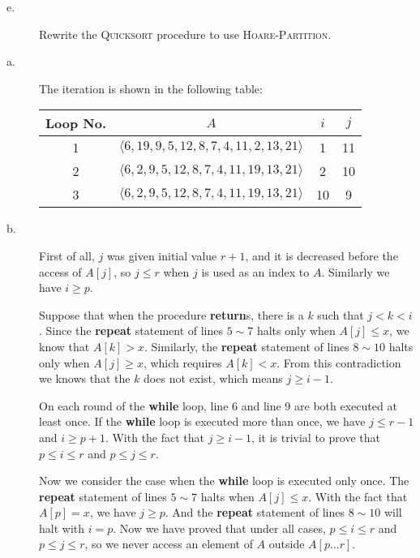 \begin{description}
\item[e. \hspace{9pt}] Rewrite the \textsc{Quicksort} procedure to use \textsc{Hoare-Partition}.
\end{description}

\answer

\begin{description}
\item[a. \hspace{9pt}] The iteration is shown in the following table:

\begin{center}
\begin{tabular}{|c|c|c|c|}
\hline
Loop No. & $A$ & $i$ & $j$\\\hline
1 & $\langle 6, 19, 9, 5, 12, 8, 7, 4, 11, 2, 13, 21\rangle$ & 1 & 11\\\hline
2 & $\langle 6, 2, 9, 5, 12, 8, 7, 4, 11, 19, 13, 21\rangle$ & 2 & 10\\\hline
3 & $\langle 6, 2, 9, 5, 12, 8, 7, 4, 11, 19, 13, 21\rangle$ & 10 & 9\\\hline
\end{tabular}
\end{center}

\item[b. \hspace{9pt}] First of all, $j$ was given initial value $r + 1$, and it is decreased before the access of $A[j]$, so $j\leq r$ when $j$ is used as an index to $A$.
Similarly we have $i \geq p$.

Suppose that when the procedure \textbf{return}s, there is a $k$ such that $j < k < i$. Since the \textbf{repeat} statement of lines $5 \sim 7$ halts only when $A[j] \leq x$, 
we know that $A[k] > x$. Similarly, the \textbf{repeat} statement of lines $8 \sim 10$ halts only when $A[j] \geq x$, which requires $A[k] < x$. From this contradiction we knows
that the $k$ does not exist, which means $j \geq i - 1$.

On each round of the \textbf{while} loop, line 6 and line 9 are both executed at least once. If the \textbf{while} loop is executed more than once, we have $j \leq r - 1$ and
$i \geq p + 1$. With the fact that $j \geq i -1$, it is trivial to prove that  $p \leq i \leq r$ and $p \leq j \leq r$.


Now we consider the case when the \textbf{while} loop is executed only once. The \textbf{repeat} statement of lines $5 \sim 7$ halts when $A[j] \leq x$. With the fact that $A[p] = x$,
we have $j \geq p$. And the \textbf{repeat} statement of lines $8 \sim 10$ will halt with $i = p$. Now we have proved that under all cases, $p \leq i \leq r$ and $p \leq j \leq r$, 
so we never access an element of $A$ outside $A[p\ldots r]$.


\end{description}

